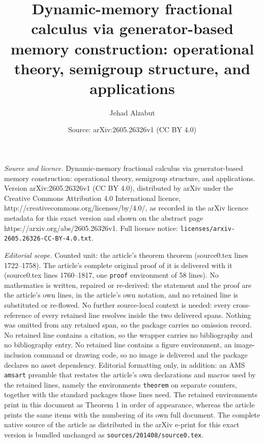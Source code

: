 \documentclass[10pt,a4paper]{amsart}
\title{Dynamic-memory fractional calculus via generator-based memory construction: operational theory, semigroup structure, and applications}
\author{Jehad Alzabut}
\date{Source: arXiv:2605.26326v1 (CC BY 4.0)}
\begin{document}
\maketitle

\noindent\emph{Source and licence.} Dynamic-memory fractional calculus via generator-based memory construction: operational theory, semigroup structure, and applications. Version arXiv:2605.26326v1 (CC BY 4.0), distributed by arXiv under the Creative Commons Attribution 4.0 International licence, http://creativecommons.org/licenses/by/4.0/, as recorded in the arXiv licence metadata for this exact version and shown on the abstract page https://arxiv.org/abs/2605.26326v1. Full licence notice: \texttt{licenses/arxiv-2605.26326-CC-BY-4.0.txt}.\par\smallskip

\noindent\textit{Editorial scope.} Counted unit: the article's theorem theorem (source0.tex lines 1722--1758). The article's complete original proof of it is delivered with it (source0.tex lines 1760--1817, one \texttt{proof} environment of 58 lines). No mathematics is written, repaired or re-derived: the statement and the proof are the article's own lines, in the article's own notation, and no retained line is substituted or re-flowed.  No further source-local context is needed: every cross-reference of every retained line resolves inside the two delivered spans.  Nothing was omitted from any retained span, so the package carries no omission record.  No retained line contains a citation, so the wrapper carries no bibliography and no bibliography entry.  No retained line contains a figure environment, an image-inclusion command or drawing code, so no image is delivered and the package declares no asset dependency.  Editorial formatting only, in addition: an AMS \texttt{amsart} preamble that restates the article's own declarations and macros used by the retained lines, namely the environments \texttt{theorem} on separate counters, together with the standard packages those lines need.  The retained environments print in this document as Theorem 1 in order of appearance, whereas the article prints the same items with the numbering of its own full document.  The complete native source of the article as distributed in the arXiv e-print for this exact version is bundled unchanged as \texttt{sources/201408/source0.tex}.
\end{document}

